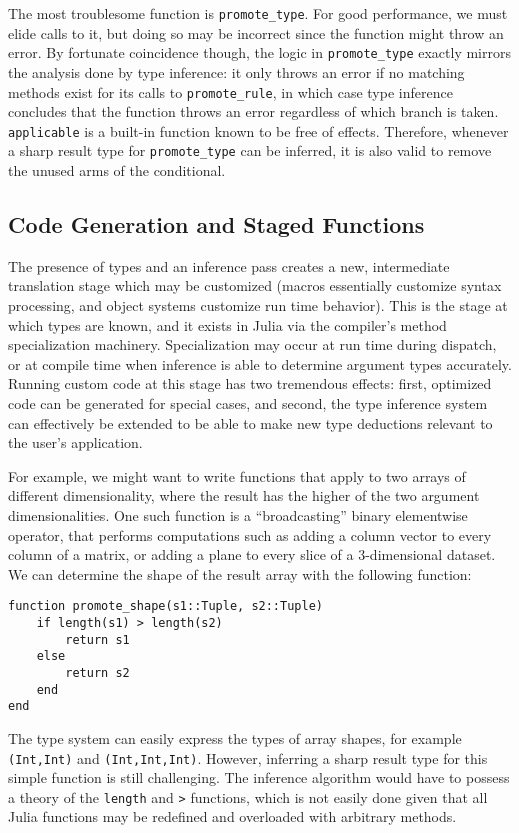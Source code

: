 \documentclass[9pt]{sigplanconf}
\begin{document}
The most troublesome function is {\tt promote\_type}. For good performance,
we must elide calls to it, but doing so may be incorrect since the function
might throw an error. By fortunate coincidence though, the logic in
{\tt promote\_type} exactly mirrors the analysis done by type inference: it
only throws an error if no matching methods exist for its calls to
{\tt promote\_rule}, in which case type inference concludes that the
function throws an error regardless of which branch is taken.
{\tt applicable} is a built-in function known to be free of effects.
Therefore, whenever a sharp result type for {\tt promote\_type} can be
inferred, it is also valid to remove the unused arms of the conditional.


\subsection{Code Generation and Staged Functions}

The presence of types and an inference pass creates a new, intermediate
translation stage which may be customized (macros essentially customize
syntax processing, and object systems customize run time behavior).
This is the stage at which types are known, and it exists in Julia via
the compiler's method specialization machinery. Specialization may occur
at run time during dispatch, or at compile time when inference is able
to determine argument types accurately.
Running custom code at this stage has two tremendous effects:
first, optimized code can be generated for special cases, and
second, the type inference system can effectively be extended to be able to
make new type deductions relevant to the user's application.

For example, we might want to write functions that apply to two
arrays of different dimensionality, where the result has the higher of the
two argument dimensionalities. One such function is a ``broadcasting''
binary elementwise operator, that performs computations such as adding a
column vector to every column of a matrix, or adding a plane to every slice
of a 3-dimensional dataset. We can determine the shape of the result
array with the following function:

\begin{verbatim}
function promote_shape(s1::Tuple, s2::Tuple)
    if length(s1) > length(s2)
        return s1
    else
        return s2
    end
end
\end{verbatim}

The type system can easily express the types of array shapes, for example
{\tt (Int,Int)} and {\tt (Int,Int,Int)}. However, inferring a sharp result
type for this simple function is still challenging. The inference algorithm
would have to possess a theory of the {\tt length} and {\tt >} functions,
which is not easily done given that all Julia functions may be redefined
and overloaded with arbitrary methods.
\end{document}
